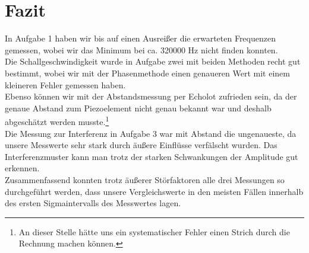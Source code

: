 \documentclass[12pt]{scrartcl}
\begin{document}
\section{Fazit}
In Aufgabe 1 haben wir bis auf einen Ausreißer die erwarteten Frequenzen gemessen, wobei wir das Minimum bei ca. 320000 Hz nicht finden konnten.\\
Die Schallgeschwindigkeit wurde in Aufgabe zwei mit beiden Methoden recht gut bestimmt, wobei wir mit der Phasenmethode einen genaueren Wert mit einem kleineren Fehler gemessen haben.\\
Ebenso können wir mit der Abstandsmessung per Echolot zufrieden sein, da der genaue Abstand zum Piezoelement nicht genau bekannt war und deshalb abgeschätzt werden musste.\footnote{An dieser Stelle hätte uns ein systematischer Fehler einen Strich durch die Rechnung machen können.}\\
Die Messung zur Interferenz in Aufgabe 3 war mit Abstand die ungenaueste, da unsere Messwerte sehr stark durch äußere Einflüsse verfälscht wurden. Das Interferenzmuster kann man trotz der starken Schwankungen der Amplitude gut erkennen.\\
Zusammenfassend konnten trotz äußerer Störfaktoren alle drei Messungen so durchgeführt werden, dass unsere Vergleichswerte in den meisten Fällen innerhalb des ersten Sigmaintervalls des Messwertes lagen. 

\end{document}
